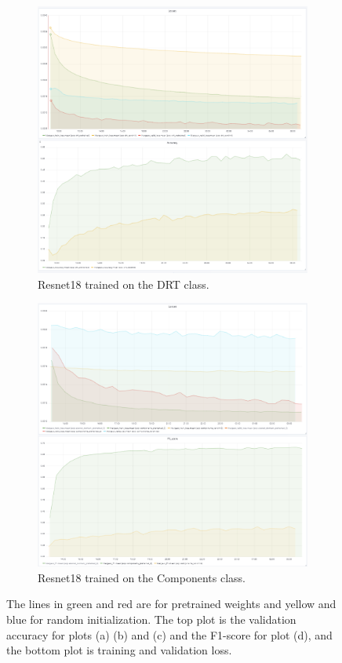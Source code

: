 \begin{figure}
\begin{subfigure}{.5\textwidth}
  \centering
  \includegraphics[width=.8\linewidth]{figures/04-Init_drt_acc.PNG}
  \caption{Resnet18 trained on the DRT class.}
  \label{fig:resinit_drt}
\end{subfigure}%
\begin{subfigure}{.5\textwidth}
  \centering
  \includegraphics[width=.8\linewidth]{figures/04-Init_components_acc.PNG}
  \caption{Resnet18 trained on the Components class.}
  \label{fig:resinit_compo}
\end{subfigure}
\caption{The lines in green and red are for pretrained weights and yellow and blue for random initialization. The top plot is the validation accuracy for plots (a) (b) and (c) and the F1-score for plot (d), and the bottom plot is training  and validation loss.}
\label{fig:plotsres}
\end{figure}
